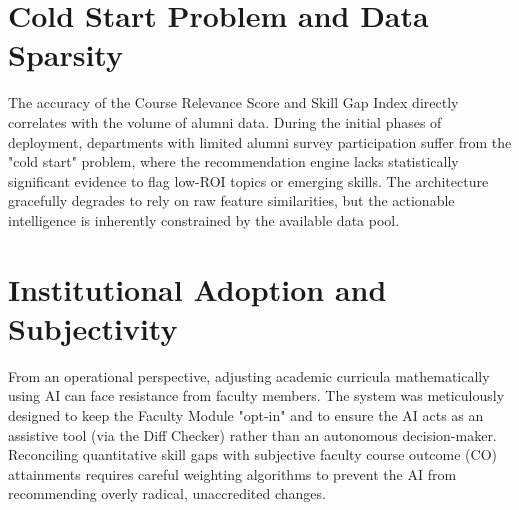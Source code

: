 \section{Cold Start Problem and Data Sparsity}
The accuracy of the Course Relevance Score and Skill Gap Index directly correlates with the volume of alumni data. During the initial phases of deployment, departments with limited alumni survey participation suffer from the "cold start" problem, where the recommendation engine lacks statistically significant evidence to flag low-ROI topics or emerging skills. The architecture gracefully degrades to rely on raw feature similarities, but the actionable intelligence is inherently constrained by the available data pool.

\section{Institutional Adoption and Subjectivity}
From an operational perspective, adjusting academic curricula mathematically using AI can face resistance from faculty members. The system was meticulously designed to keep the Faculty Module "opt-in" and to ensure the AI acts as an assistive tool (via the Diff Checker) rather than an autonomous decision-maker. Reconciling quantitative skill gaps with subjective faculty course outcome (CO) attainments requires careful weighting algorithms to prevent the AI from recommending overly radical, unaccredited changes.
